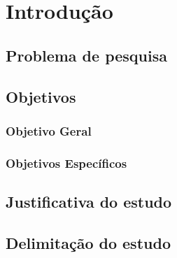 \section{Introdução}
\label{sec:introducao}
\aescrever


\subsection{Problema de pesquisa}
\label{sec:problema}
\aescrever


\subsection{Objetivos}
\label{sec:objetivos}
\aescrever


\subsubsection{Objetivo Geral}
\aescrever


\subsubsection{Objetivos Específicos}
\aescrever
%


\subsection{Justificativa do estudo}
\label{sec:justificativa}
\aescrever


\subsection{Delimitação do estudo}
\label{sec:delimitacao}
\aescrever
